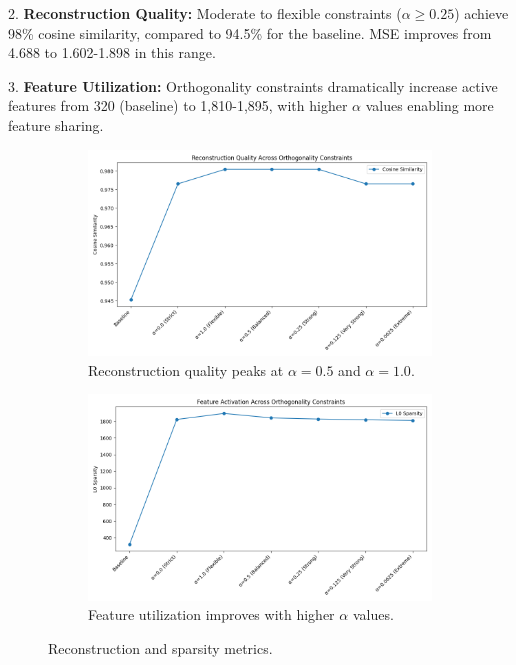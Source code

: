 \documentclass{article} %
\begin{document}
2. \textbf{Reconstruction Quality:} Moderate to flexible constraints ($\alpha \geq 0.25$) achieve 98\% cosine similarity, compared to 94.5\% for the baseline. MSE improves from 4.688 to 1.602-1.898 in this range.

3. \textbf{Feature Utilization:} Orthogonality constraints dramatically increase active features from 320 (baseline) to 1,810-1,895, with higher $\alpha$ values enabling more feature sharing.

\begin{figure}[h]
\centering
\begin{subfigure}{0.48\textwidth}
\includegraphics[width=\textwidth]{reconstruction_quality_comparison.png}
\caption{Reconstruction quality peaks at $\alpha=0.5$ and $\alpha=1.0$.}
\label{fig:recon}
\end{subfigure}
\hfill
\begin{subfigure}{0.48\textwidth}
\includegraphics[width=\textwidth]{sparsity_comparison.png}
\caption{Feature utilization improves with higher $\alpha$ values.}
\label{fig:sparsity}
\end{subfigure}
\caption{Reconstruction and sparsity metrics.}
\label{fig:performance}
\end{figure}
\end{document}
